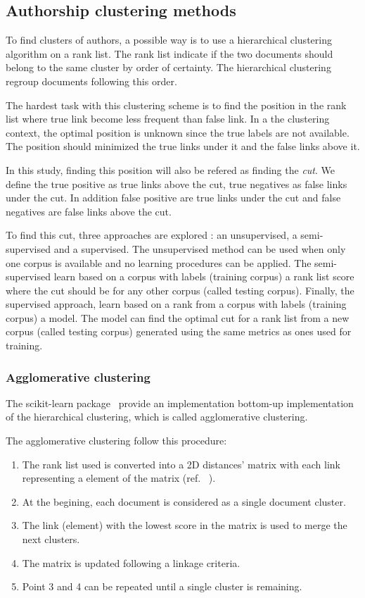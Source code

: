 \subsection{Authorship clustering methods \label{sec:authorship_clustering_methods}}

To find clusters of authors, a possible way is to use a hierarchical clustering algorithm on a rank list.
The rank list indicate if the two documents should belong to the same cluster by order of certainty.
The hierarchical clustering regroup documents following this order.

The hardest task with this clustering scheme is to find the position in the rank list where true link become less frequent than false link.
In a the clustering context, the optimal position is unknown since the true labels are not available.
The position should minimized the true links under it and the false links above it.

In this study, finding this position will also be refered as finding the \textit{cut}.
We define the true positive as true links above the cut, true negatives as false links under the cut.
In addition false positive are true links under the cut and false negatives are false links above the cut.

To find this cut, three approaches are explored : an unsupervised, a semi-supervised and a supervised.
The unsupervised method can be used when only one corpus is available and no learning procedures can be applied.
The semi-supervised learn based on a corpus with labels (training corpus) a rank list score where the cut should be for any other corpus (called testing corpus).
Finally, the supervised approach, learn based on a rank from a corpus with labels (training corpus) a model.
The model can find the optimal cut for a rank list from a new corpus (called testing corpus) generated using the same metrics as ones used for training.

\subsubsection{Agglomerative clustering}

The scikit-learn package~\cite{sklearn} provide an implementation bottom-up implementation of the hierarchical clustering, which is called agglomerative clustering.

The agglomerative clustering follow this procedure:
\begin{enumerate}
  \item The rank list used is converted into a 2D distances' matrix with each link representing a element of the matrix (ref. ~\label{sec:distances_matrix}).
  \item At the begining, each document is considered as a single document cluster.
  \item The link (element) with the lowest score in the matrix is used to merge the next clusters.
  \item The matrix is updated following a linkage criteria.
  \item Point 3 and 4 can be repeated until a single cluster is remaining.
\end{enumerate}

